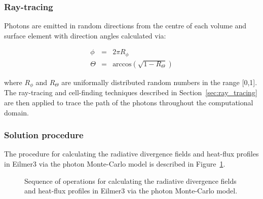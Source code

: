 \subsubsection{Ray-tracing}

Photons are emitted in random directions from the centre of each volume and surface element with direction angles calculated via:

\begin{eqnarray}
 \phi &=& 2 \pi R_{\phi} \\
 \Theta &=& \text{arccos} \left ( \sqrt{ 1 - R_\Theta } \right )
\end{eqnarray}

\noindent where $R_{\phi}$ and $R_{\Theta}$ are uniformally distributed random numbers in the range [0,1].
The ray-tracing and cell-finding techniques described in Section~\ref{sec:ray_tracing} are then applied to trace the path of the photons throughout the computational domain.

\subsubsection{Solution procedure}

The procedure for calculating the radiative divergence fields and heat-flux profiles in Eilmer3  via the photon Monte-Carlo model is described in Figure~\ref{fig:eilmer-PMC-solve-procedure}.

\begin{figure}[htbp]
\small
\begin{center}
\end{center}
\caption{Sequence of operations for calculating the radiative divergence fields and heat-flux profiles in Eilmer3 via the photon Monte-Carlo model.}
\label{fig:eilmer-PMC-solve-procedure}
\end{figure}

